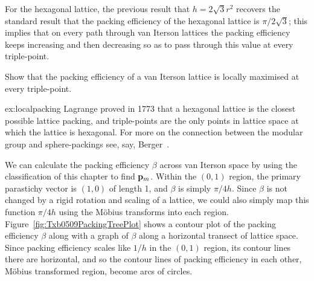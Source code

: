 For the hexagonal lattice, the previous result that $h= 2\sqrt{3} r^2$ 
recovers the standard result that the packing efficiency of the hexagonal lattice is $\pi/2\sqrt{3}$; this implies that on every path through van Iterson lattices the packing efficiency keeps increasing and then decreasing so as to pass through this value at every triple-point.  
\begin{jExercise}\label{ex:localpacking}
Show that the packing efficiency of a van Iterson lattice is locally maximised at every triple-point.
\end{jExercise}
\begin{jAnswer}{ex:localpacking}{
	Lagrange proved in 1773 that a hexagonal lattice is the closest possible lattice packing, and triple-points are the only points in lattice space at which the lattice is hexagonal. For more on the connection between the modular group and sphere-packings see, say, Berger~\cite{bergerGeometryRevealedJacob2010}.
}\end{jAnswer}
We can calculate the packing efficiency $\beta$ across van Iterson space by using the classification of this chapter to find ${\mathbf p}_{m}$.  Within the $(0,1)$ region, the primary parastichy vector is $(1,0)$ of length 1, and $\beta$ is simply $\pi/ {4 h }$.  Since $\beta$ is not changed by a rigid rotation and scaling of a lattice, we could also simply map this function  $\pi/ {4 h }$ using the M{\"o}bius transforms into each region. Figure~\ref{fig:Txb0509PackingTreePlot} shows a contour plot of the packing efficiency $\beta$ along with a graph of $\beta$ along a horizontal transect of lattice space.
%
Since packing efficiency scales like $1/h$ in the $(0,1)$ region, its contour lines there are horizontal, and so the contour lines of packing efficiency in each other, M{\"o}bius transformed region, become arcs of circles. 

